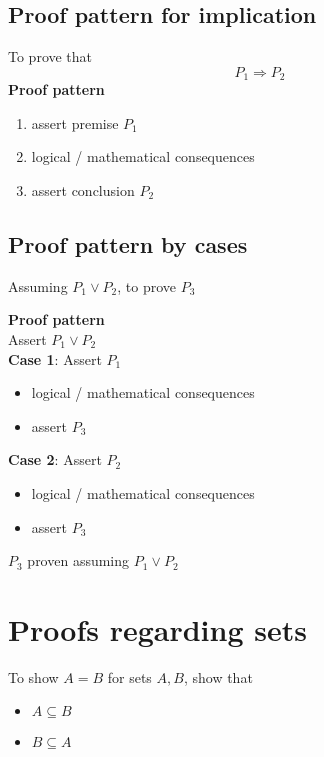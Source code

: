 \subsection{Proof pattern for implication}

\begin{framed}
   To prove that
   \[
     P_1 \Rightarrow P_2
   \] 
   \textbf{Proof pattern}
   \begin{enumerate}
      \item assert premise $P_1$
      \item logical / mathematical consequences
      \item assert conclusion $P_2$
   \end{enumerate}
\end{framed}

\subsection{Proof pattern by cases}

\begin{framed}
   Assuming $P_1 \lor P_2$, to prove $P_3$

   \textbf{Proof pattern} \\

   Assert $P_1 \lor P_2$ \\

   \textbf{Case 1}: Assert $P_1$
   \begin{itemize}
      \item logical / mathematical consequences 
      \item assert $P_3$
   \end{itemize}

   \textbf{Case 2}: Assert $P_2$
   \begin{itemize}
      \item logical / mathematical consequences 
      \item assert $P_3$
   \end{itemize}

   $P_3$ proven assuming $P_1 \lor P_2$
\end{framed}

\section{Proofs regarding sets}
\begin{framed}
   To show $A = B$ for sets $A, B$, show that
   \begin{itemize}
      \item $A \subseteq B$
      \item $B \subseteq A$
   \end{itemize}
   
  
\end{framed}


